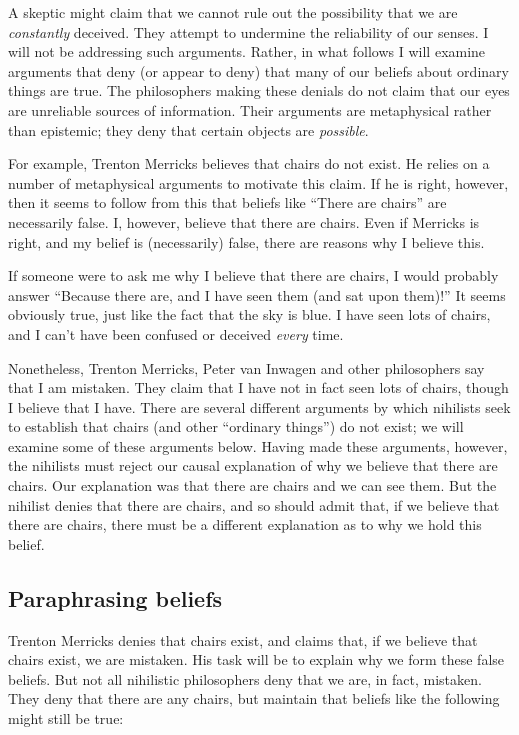 \documentclass[11pt]{article}
\begin{document}
\begin{spacing}{1.5}
A skeptic might claim that we cannot rule out the possibility that we
are {\em constantly} deceived.  They attempt to undermine the
reliability of our senses.  I will not be addressing such arguments.
Rather, in what follows I will examine arguments that deny (or appear
to deny) that many of our beliefs about ordinary things are true.  The
philosophers making these denials do not claim that our eyes are
unreliable sources of information.  Their arguments are metaphysical
rather than epistemic; they deny that certain objects are {\em
  possible}.

For example, Trenton Merricks believes that chairs do not exist.  He
relies on a number of metaphysical arguments to motivate this claim.
If he is right, however, then it seems to follow from this that
beliefs like ``There are chairs'' are necessarily false.  I, however,
believe that there are chairs.  Even if Merricks is right, and my
belief is (necessarily) false, there are reasons why I believe this.

If someone were to ask me why I believe that there are chairs, I would
probably answer ``Because there are, and I have seen them (and sat
upon them)!''  It seems obviously true, just like the fact that the
sky is blue.  I have seen lots of chairs, and I can't have been
confused or deceived {\em every} time.

Nonetheless, Trenton Merricks, Peter van Inwagen and other
philosophers say that I am mistaken.  They claim that I have not in
fact seen lots of chairs, though I believe that I have.  There are
several different arguments by which nihilists seek to establish that
chairs (and other ``ordinary things'') do not exist; we will examine
some of these arguments below.  Having made these arguments, however,
the nihilists must reject our causal explanation of why we believe
that there are chairs.  Our explanation was that there are chairs and
we can see them.  But the nihilist denies that there are chairs, and
so should admit that, if we believe that there are chairs, there must
be a different explanation as to why we hold this belief.

\subsection{Paraphrasing beliefs}
\label{paraphrase}
Trenton Merricks denies that chairs exist, and claims that, if we
believe that chairs exist, we are mistaken.  His task will be to
explain why we form these false beliefs.  But not all nihilistic
philosophers deny that we are, in fact, mistaken.  They deny that
there are any chairs, but maintain that beliefs like the following
might still be true:


\end{spacing}
\end{document}
